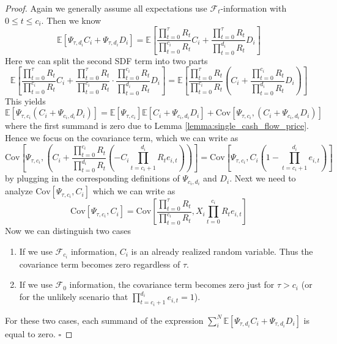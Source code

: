 \begin{proof}
	Again we generally assume all expectations use $\mathcal{F}_{t}$-information with $0 \leq t \leq c_i$.
	Then we know
	\[
	\mathbb{E} \left[ \Psi_{\tau,d_i} C_i + \Psi_{\tau,d_i} D_i  \right] = 
	\mathbb{E} \left[ 
	\frac{\prod_{t=0}^{\tau} R_t }{\prod_{t=0}^{c_i} R_t} C_i + \frac{\prod_{t=0}^{\tau} R_t }{\prod_{t=0}^{d_i} R_t} D_i \right]
	\]
	Here we can split the second SDF term into two parts
	\[
	\mathbb{E} \left[ \frac{\prod_{t=0}^{\tau} R_t }{\prod_{t=0}^{c_i} R_t} C_i + \frac{\prod_{t=0}^{\tau} R_t }{\prod_{t=0}^{c_i} R_t} \cdot \frac{\prod_{t=0}^{c_i} R_t }{\prod_{t=0}^{d_i} R_t} D_i \right] = 
	\mathbb{E} \left[ \frac{\prod_{t=0}^{\tau} R_t }{\prod_{t=0}^{c_i} R_t} \left( C_i + \frac{\prod_{t=0}^{c_i} R_t }{\prod_{t=0}^{d_i} R_t} D_i \right) \right]
	\]
	This yields
	\[
	\mathbb{E} \left[ \Psi_{\tau,c_i} \left( C_i + \Psi_{c_i,d_i} D_i \right) \right] = \mathbb{E} \left[ \Psi_{\tau,c_i} \right] \mathbb{E} \left[ C_i + \Psi_{c_i,d_i} D_i \right] + \mathrm{Cov} \left[ \Psi_{\tau,c_i}, \left( C_i + \Psi_{c_i,d_i} D_i \right) \right]
	\]
	where the first summand is zero due to Lemma \ref{lemma:single_cash_flow_price}.
	Hence we focus on the covariance term, which we can write as
	\[
	\mathrm{Cov} \left[ \Psi_{\tau,c_i}, \left( C_i + \frac{\prod_{t=0}^{c_i} R_t }{\prod_{t=0}^{d_i} R_t} \left( -C_i \prod_{t=c_i+1}^{d_i} R_t e_{i,t} \right) \right) \right]
	=
	\mathrm{Cov} \left[ \Psi_{\tau,c_i}, C_i \left( 1 - \prod_{t=c_i+1}^{d_i} e_{i,t} \right) \right]
	\]
	by plugging in the corresponding definitions of $\Psi_{c_i,d_i}$ and $D_i$.
	Next we need to analyze $\mathrm{Cov} \left[ \Psi_{\tau,c_i}, C_i \right]$ which we can write as
	\[
	\mathrm{Cov} \left[ \Psi_{\tau,c_i}, C_i \right] =
	\mathrm{Cov} \left[  \frac{\prod_{t=0}^{\tau} R_t }{\prod_{t=0}^{c_i} R_t}, X_i \prod_{t=0}^{c_i} R_t e_{i,t} \right]
	\]
	Now we can distinguish two cases
	\begin{enumerate}
		\item If we use $\mathcal{F}_{c_i}$ information, $C_i$ is an already realized random variable. Thus the covariance term becomes zero regardless of $\tau$.
		\item If we use $\mathcal{F}_{0}$ information, the covariance term becomes zero just for $\tau > c_i$ (or for the unlikely scenario that $\prod_{t=c_i+1}^{d_i} e_{i,t}=1$).
	\end{enumerate}
	For these two cases, each summand of the expression $\sum_i^N \mathbb{E} \left[ \Psi_{\tau,d_i} C_i + \Psi_{\tau,d_i} D_i  \right]$ is equal to zero. 
	$\square$
\end{proof}

